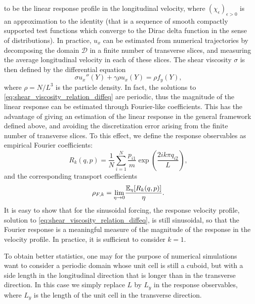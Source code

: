 to be the linear response profile in the longitudinal velocity, where $(\chi_\epsilon)_{\epsilon>0}$ is an approximation to the identity (that is a sequence of smooth compactly supported test functions which converge to the Dirac delta function in the sense of distributions).
In practice, $u_x$ can be estimated from numerical trajectories by decomposing the domain $\mathcal D$ in a finite number of transverse slices,
 and measuring the average longitudinal velocity in each of these slices.
 The shear viscosity $\sigma$ is then defined by the differential equation
\begin{equation}
    \label{eq:shear_viscosity_relation_diffeq}
    \sigma u_x''(Y)+\gamma \rho u_x(Y)=\rho f_y(Y),
\end{equation}
where $\rho= N/L^3$ is the particle density.
In fact, the solutions to \eqref{eq:shear_viscosity_relation_diffeq} are periodic, thus the magnitude of the linear response can be estimated through Fourier-like coefficients.
This has the advantage of giving an estimation of the linear response in the general framework defined above, and avoiding the discretization error arising from the finite number of transverse slices.
To this effect, we define the response observables as empirical Fourier coefficients:
\begin{equation}
    \label{eq:nemd_shear_viscosity_response}
    R_k(q,p)=\frac{1}N\sum_{i=1}^N\frac{p_{i1}}{m}\exp\left(\frac{2ik\pi q_{i2}}{L}\right),
\end{equation}
and the corresponding transport coefficients
\begin{equation}
    \label{eq:shear_viscosity_tranpsort_coefficient}
    \rho_{F,k}=\underset{\eta\to 0}{\lim}\frac{\mathbb{E}_\eta[R_k(q,p)]}{\eta}.
\end{equation}
It is easy to show that for the sinusoidal forcing, the response velocity profile, solution to \eqref{eq:shear_viscosity_relation_diffeq}, is still sinusoidal, so that the Fourier response is a meaningful measure of the magnitude of the response in the velocity profile.
In practice, it is sufficient to consider $k=1$.
\begin{remark}
    To obtain better statistics, one may for the purpose of numerical simulations want to consider a periodic domain whose unit cell is still a cuboid, but with a side length in the longitudinal direction that is longer than in the transverse direction.
    In this case we simply replace $L$ by $L_y$ in the response observables, where $L_y$ is the length of the unit cell in the transverse direction.
\end{remark}
